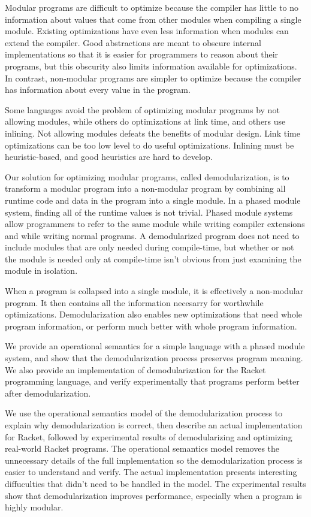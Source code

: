 \documentclass{llncs}
\begin{document}
Modular programs are difficult to optimize because the compiler has little to no information about values that come from other modules when compiling a single module.
Existing optimizations have even less information when modules can extend the compiler. 
Good abstractions are meant to obscure internal implementations so that it is easier for programmers to reason about their programs, but this obscurity also limits information available for optimizations.  
In contrast, non-modular programs are simpler to optimize because the compiler has information about every value in the program.

Some languages avoid the problem of optimizing modular programs by not allowing modules, while others do optimizations at link time, and others use inlining. 
Not allowing modules defeats the benefits of modular design. 
Link time optimizations can be too low level to do useful optimizations. 
Inlining must be heuristic-based, and good heuristics are hard to develop. 

Our solution for optimizing modular programs, called demodularization, is to transform a modular program into a non-modular program by combining all runtime code and data in the program into a single module.
In a phased module system, finding all of the runtime values is not trivial.
Phased module systems allow programmers to refer to the same module while writing compiler extensions and while writing normal programs.
A demodularized program does not need to include modules that are only needed during compile-time, but whether or not the module is needed only at compile-time isn't obvious from just examining the module in isolation. 

When a program is collapsed into a single module, it is effectively a non-modular program. It then contains all the information necesarry for worthwhile optimizations. Demodularization also enables new optimizations that need whole program information, or perform much better with whole program information. 

We provide an operational semantics for a simple language with a phased module system, and show that the demodularization process preserves program meaning. We also provide an implementation of demodularization for the Racket programming language, and verify experimentally that programs perform better after demodularization.

We use the operational semantics model of the demodularization process to explain why demodularization is correct, then describe an actual implementation for Racket, followed by experimental results of demodularizing and optimizing real-world Racket programs. The operational semantics model removes the unnecessary details of the full implementation so the demodularization process is easier to understand and verify. The actual implementation presents interesting diffuculties that didn't need to be handled in the model. The experimental results show that demodularization improves performance, especially when a program is highly modular. 
\end{document}

